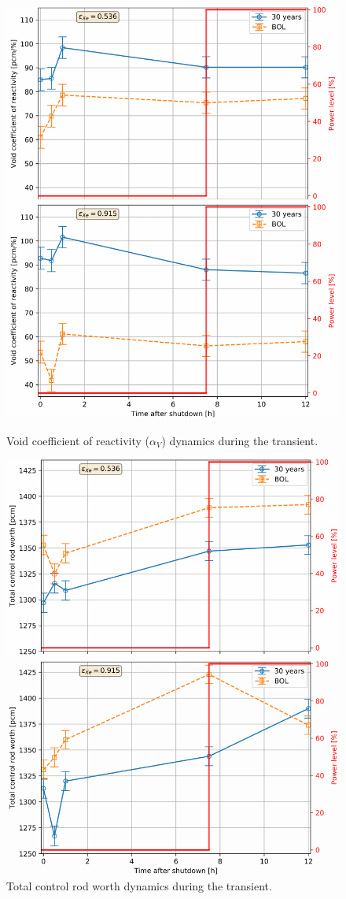 \begin{frame}
\begin{textblock*}{12.5cm}
\begin{columns}
\begin{figure}[t]
\begin{overprint}
				\includegraphics[width=0.87\linewidth]{./images/msbr_void_evo.png}
				\vspace{-1mm}
				\caption{Void coefficient of reactivity ($\alpha_V$) dynamics
					during the transient.}
				\includegraphics[width=0.87\linewidth]{./images/msbr_crw_evo.png}
				\vspace{-1mm}
				\caption{Total control rod worth dynamics during 
				the transient.}
			\end{overprint}
		\end{figure}
		

\end{columns}
\end{textblock*}
\end{frame}
